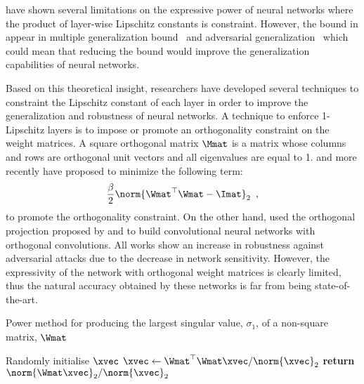 \noindent
\citet{huster2018limitations} have shown several limitations on the expressive power of neural networks where the product of layer-wise Lipschitz constants is constraint.
However, the bound in  appear in multiple generalization bound~\cite{neyshabur2017,bartlett2017spectrally,golowich2018} and adversarial generalization~\cite{farnia2018generalizable} which could mean that reducing the bound would improve the generalization capabilities of neural networks.




Based on this theoretical insight, researchers have developed several techniques to constraint the Lipschitz constant of each layer in order to improve the generalization and robustness of neural networks.
A technique to enforce 1-Lipschitz layers is to impose or promote an orthogonality constraint on the weight matrices.
A square orthogonal matrix $\Mmat$ is a matrix whose columns and rows are orthogonal unit vectors and all eigenvalues are equal to 1.
\citet{cisse2017parseval} and more recently \citet{wang2020orthogonal,huang2020controllable} have proposed to minimize the following term:
\begin{equation}
  \frac{\beta}{2} \norm{\Wmat^\top \Wmat - \Imat}_2  \enspace, 
\end{equation}
to promote the orthogonality constraint.
On the other hand, \citet{li2019preventing} used the orthogonal projection proposed by \citet{kautsky1994matrix} and \citet{xiao2018dynamical} to build convolutional neural networks with orthogonal convolutions.
All works show an increase in robustness against adversarial attacks due to the decrease in network sensitivity.
However, the expressivity of the network with orthogonal weight matrices is clearly limited, thus the natural accuracy obtained by these networks is far from being state-of-the-art. 


\begin{algorithm}[ht]
  \caption{Power method for producing the largest singular value, $\sigma_1$, of a non-square matrix, $\Wmat$ \cite{gouk2018regularisation,golub2000eigenvalue}}
  \begin{algorithmic}[1]
    \State Randomly initialise $\xvec$
      \State $\xvec \gets \Wmat^\top \Wmat \xvec / \norm{\xvec}_2$
    \EndFor
    \State \textbf{return} $\norm{\Wmat \xvec}_2 / \norm{\xvec}_2$
  \end{algorithmic}
  \label{algorithm:ch3-power_method}
\end{algorithm}

